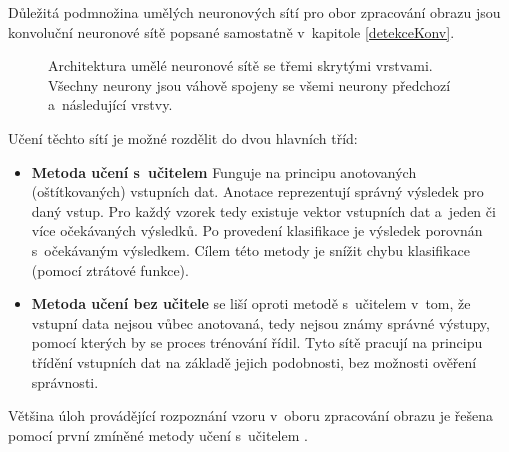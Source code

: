 Důležitá podmnožina umělých neuronových sítí pro obor zpracování obrazu jsou konvoluční neuronové sítě popsané samostatně v~kapitole \ref{detekceKonv}.

\begin{figure}[H]
    \centering
    \caption{Architektura umělé neuronové sítě se třemi skrytými vrstvami. Všechny neurony jsou váhově spojeny se všemi neurony předchozí a~následující vrstvy.}
    \label{fig:ann}
\end{figure}

Učení těchto sítí je možné rozdělit do dvou hlavních tříd:

\begin{itemize}
    \item \textbf{Metoda učení s~učitelem} Funguje na principu anotovaných (oštítkovaných) vstupních dat. Anotace reprezentují správný výsledek pro daný vstup. Pro každý vzorek tedy existuje vektor vstupních dat a~jeden či více očekávaných výsledků. Po provedení klasifikace je výsledek porovnán s~očekávaným výsledkem. Cílem této metody je snížit chybu klasifikace (pomocí ztrátové funkce).
    \item \textbf{Metoda učení bez učitele} se liší oproti metodě s~učitelem v~tom, že vstupní data nejsou vůbec anotovaná, tedy nejsou známy správné výstupy, pomocí kterých by se proces trénování řídil. Tyto sítě pracují na principu třídění vstupních dat na základě jejich podobnosti, bez možnosti ověření správnosti.
\end{itemize}

Většina úloh provádějící rozpoznání vzoru v~oboru zpracování obrazu je řešena pomocí první zmíněné metody učení s~učitelem \cite{CNN}.


